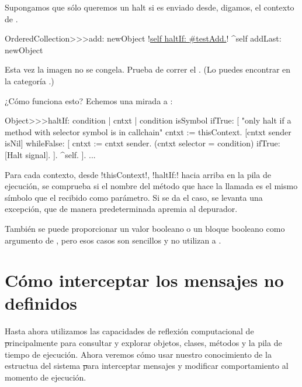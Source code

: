 \documentclass[a4paper,10pt,twoside]{book}
\begin{document}
Supongamos que s\'olo queremos un halt si  es enviado desde,
digamos, el contexto de .

\begin{code}{}
OrderedCollection>>>add: newObject
        !\underline{self haltIf: \#testAdd.}!
        ^self addLast: newObject
\end{code}

Esta vez la imagen no se congela.  Prueba de correr el
.  (Lo puedes encontrar en la categor\'ia
.) 

¿C\'omo funciona esto?  Echemos una mirada a
: 
\begin{code}{}
Object>>>haltIf: condition
        | cntxt |
        condition isSymbol ifTrue: [
                "only halt if a method with selector symbol is in callchain"
                cntxt := thisContext.
                [cntxt sender isNil] whileFalse: [
                        cntxt := cntxt sender.
                        (cntxt selector = condition) ifTrue: [Halt signal]. ].
                ^self.
        ].
        ...
\end{code}

Para cada contexto, desde \ct!thisContext!, \ct!haltIf:! hacia arriba
en la pila de ejecuci\'on, se comprueba si el nombre del m\'etodo que hace
la llamada es el mismo s\'imbolo que el recibido como par\'ametro.  Si se
da el caso, se levanta una excepci\'on, que de manera predeterminada
apremia al depurador.

Tambi\'en se puede proporcionar un valor booleano o un bloque booleano
como argumento de , pero esos casos son sencillos y no
utilizan a .

\section{C\'omo interceptar los mensajes no definidos}

Hasta ahora utilizamos las capacidades de reflexi\'on computacional de
\st principalmente para consultar y explorar objetos, clases, m\'etodos
y la pila de tiempo de ejecuci\'on.  Ahora veremos c\'omo usar nuestro
conocimiento de la estructua del sistema \st para interceptar mensajes
y modificar comportamiento al momento de ejecuci\'on.
\end{document}
